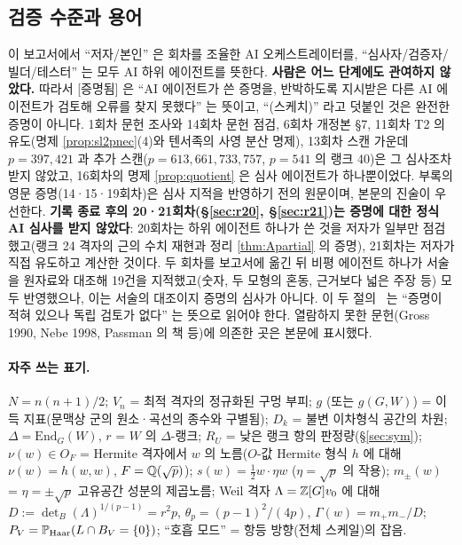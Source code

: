 \subsection{검증 수준과 용어}
이 보고서에서 ``저자/본인'' 은 회차를 조율한 AI 오케스트레이터를, ``심사자/검증자/빌더/테스터'' 는 모두 AI 하위 에이전트를 뜻한다. \textbf{사람은 어느 단계에도 관여하지 않았다.} 따라서 [증명됨] 은 ``AI 에이전트가 쓴 증명을, 반박하도록 지시받은 다른 AI 에이전트가 검토해 오류를 찾지 못했다'' 는 뜻이고, ``(스케치)'' 라고 덧붙인 것은 완전한 증명이 아니다. 1회차 문헌 조사와 14회차 문헌 점검, 6회차 개정본 \S7, 11회차 T2 의 유도(명제 \ref{prop:sl2pnec}(4)와 텐서족의 사영 분산 명제), 13회차 스캔 가운데 $p=397,421$ 과 추가 스캔($p=613,661,733,757$, $p=541$ 의 랭크 40)은 그 심사조차 받지 않았고, 16회차의 명제 \ref{prop:quotient} 은 심사 에이전트가 하나뿐이었다. 부록의 영문 증명(14·15·19회차)은 심사 지적을 반영하기 전의 원문이며, 본문의 진술이 우선한다. \textbf{기록 종료 후의 20·21회차(\S\ref{sec:r20}, \S\ref{sec:r21})는 증명에 대한 정식 AI 심사를 받지 않았다}: 20회차는 하위 에이전트 하나가 쓴 것을 저자가 일부만 점검했고(랭크 24 격자의 근의 수치 재현과 정리 \ref{thm:Apartial} 의 증명), 21회차는 저자가 직접 유도하고 계산한 것이다. 두 회차를 보고서에 옮긴 뒤 비평 에이전트 하나가 서술을 원자료와 대조해 19건을 지적했고(숫자, 두 모형의 혼동, 근거보다 넓은 주장 등) 모두 반영했으나, 이는 서술의 대조이지 증명의 심사가 아니다. 이 두 절의 \tagP\ 는 ``증명이 적혀 있으나 독립 검토가 없다'' 는 뜻으로 읽어야 한다. 열람하지 못한 문헌(Gross 1990, Nebe 1998, Passman 의 책 등)에 의존한 곳은 본문에 표시했다.

\paragraph{자주 쓰는 표기.} $N=n(n+1)/2$; $V_n$ = 최적 격자의 정규화된 구멍 부피; $g$ (또는 $g(G,W)$) = 이득 지표(문맥상 군의 원소·곡선의 종수와 구별됨); $D_k$ = 불변 이차형식 공간의 차원; $\Delta=\mathrm{End}_G(W)$, $r$ = $W$ 의 $\Delta$-랭크; $R_U$ = 낮은 랭크 항의 판정량(\S\ref{sec:sym}); $\nu(w)\in O_F$ = Hermite 격자에서 $w$ 의 노름($O$-값 Hermite 형식 $h$ 에 대해 $\nu(w)=h(w,w)$, $F=\Q(\sqrt p)$); $s(w)=\tfrac12w\cdot\eta w$ ($\eta=\sqrt p$ 의 작용); $m_\pm(w)$ = $\eta=\pm\sqrt p$ 고유공간 성분의 제곱노름; Weil 격자 $\Lambda=\Z[G]v_0$ 에 대해 $D:=\det_B(\Lambda)^{1/(p-1)}=r^2p$, $\theta_p=(p-1)^2/(4p)$, $\Gamma(w)=m_+m_-/D$; $P_V=\P_{\rm Haar}(L\cap B_V=\{0\})$; ``호흡 모드'' = 항등 방향(전체 스케일)의 잡음.

